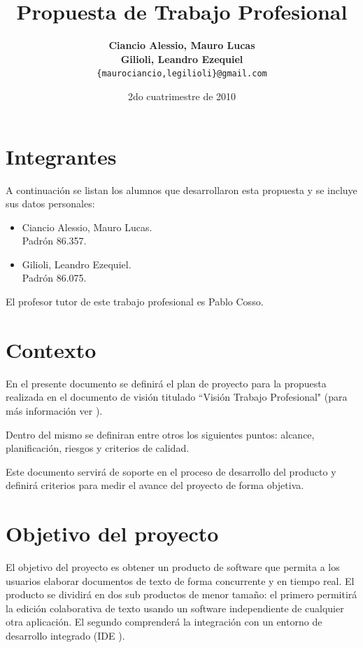 \documentclass[12pt,a4paper]{article}
\title { \textbf{Propuesta de Trabajo Profesional}}
\date{2do cuatrimestre de 2010}
\author{\textbf{Ciancio Alessio, Mauro Lucas} \\
		\textbf{Gilioli, Leandro Ezequiel}	  \\
		\texttt{\{maurociancio,legilioli\}@gmail.com}
	}
\begin{document}
\maketitle
\tableofcontents
\newpage

	\section{Integrantes}

A continuación se listan los alumnos que desarrollaron esta propuesta y se incluye sus datos personales:

	\begin{itemize}
		\item Ciancio Alessio, Mauro Lucas. \\
		      Padrón 86.357.
		\item Gilioli, Leandro Ezequiel. \\
		      Padrón 86.075.
	\end{itemize}

El profesor tutor de este trabajo profesional es Pablo Cosso.

	\section{Contexto}

	En el presente documento se definirá el plan de proyecto para la propuesta realizada en el documento de visión titulado ``Visión Trabajo Profesional" (para más información ver \cite{visiontpprof}). 

	Dentro del mismo se definiran entre otros los siguientes puntos: alcance, planificación, riesgos y criterios de calidad. 

	Este documento servirá de soporte en el proceso de desarrollo del producto y definirá criterios para medir el avance del proyecto de forma objetiva.	
		
	\section{Objetivo del proyecto}

El objetivo del proyecto es obtener un producto de software que permita a los usuarios elaborar documentos de texto de forma concurrente y en tiempo real. El producto se dividirá en dos sub productos de menor tamaño: el primero permitirá la edición colaborativa de texto usando un software independiente de cualquier otra aplicación. El segundo comprenderá la integración con un entorno de desarrollo integrado (IDE \cite{ide}).
\end{document}

